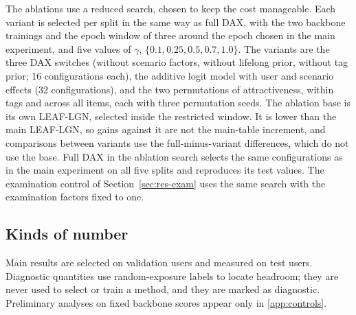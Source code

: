 The ablations use a reduced search, chosen to keep the cost manageable. Each variant is selected per split in the same way as full DAX, with the
two backbone trainings and the epoch window of three around the epoch chosen in the main experiment, and five values of $\gamma$,
$\{0.1,0.25,0.5,0.7,1.0\}$. The variants are the three DAX switches (without scenario factors, without lifelong prior, without tag prior; 16
configurations each), the additive logit model with user and scenario effects (32 configurations), and the two permutations of attractiveness,
within tags and across all items, each with three permutation seeds. The ablation base is its own LEAF-LGN, selected inside the restricted window.
It is lower than the main LEAF-LGN, so gains against it are not the main-table increment, and comparisons between variants use the full-minus-variant
differences, which do not use the base. Full DAX in the ablation search selects the same configurations as in the main experiment on all five
splits and reproduces its test values. The examination control of Section~\ref{sec:res-exam} uses the same search with the
examination factors fixed to one.

\subsection{Kinds of number}
\label{sec:protocol-kinds}

Main results are selected on validation users and measured on test users. Diagnostic quantities use random-exposure labels to locate headroom;
they are never used to select or train a method, and they are marked as diagnostic. Preliminary analyses on fixed backbone scores appear only in
\ref{app:controls}.
